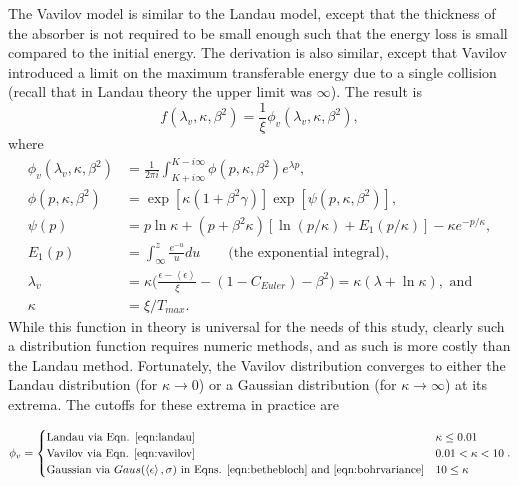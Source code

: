 \label{sec:ICOOLVavilov}\par
The Vavilov model \cite{vavilov} is similar to the Landau model, except that the thickness of the absorber is not required to be small enough such that the energy loss is small compared to the initial energy. The derivation is also similar, except that Vavilov introduced a limit on the maximum transferable energy due to a single collision (recall that in Landau theory the upper limit was $\infty$). The result is
\begin{equation}\label{eqn:vavilov}
f(\lambda_v, \kappa, \beta^2)=\frac{1}{\xi}\phi_v (\lambda_v , \kappa, \beta^2),
\end{equation}
where
\begin{align*}
\phi_v (\lambda_v,\kappa,\beta^2)&=\frac{1}{2\pi i}\int_{K+i\infty} ^{K-i\infty} \phi(p,\kappa,\beta^2) e^{\lambda p},\\
\phi(p,\kappa,\beta^2)&=\exp[\kappa(1+\beta^2 \gamma)]\exp[\psi(p,\kappa,\beta^2)],\\
\psi(p)&=p\ln \kappa + (p+\beta^2\kappa)[\ln(p/\kappa)+E_1 (p/\kappa)]-\kappa e^{-p/\kappa},\\
E_1 (p)&= \int_\infty ^z \frac{e^{-u}}{u} du \qquad \text{(the exponential integral)},\\
\lambda_v &= \kappa\Big(\frac{\epsilon-\left<\epsilon\right>}{\xi}-(1-C_{Euler})-\beta^2\Big)= \kappa(\lambda+\ln\kappa),\text{ and}\\
\kappa&=\xi/T_{max}.
\end{align*}
While this function in theory is universal for the needs of this study, clearly such a distribution function requires numeric methods, and as such is more costly than the Landau method. Fortunately, the Vavilov distribution converges to either the Landau distribution (for $\kappa\rightarrow 0$) or a Gaussian distribution (for $\kappa\rightarrow\infty$) at its extrema. The cutoffs for these extrema in practice are

\begin{align*}
\phi_v=
	\begin{cases}
	\text{Landau via Eqn. \ref{eqn:landau}} & \kappa\leq 0.01\\
	\text{Vavilov via Eqn. \ref{eqn:vavilov}} & 0.01 < \kappa < 10\\
	\text{Gaussian via }Gaus(\left<\epsilon\right>,\sigma)\text{ in Eqns. \ref{eqn:bethebloch} and \ref{eqn:bohrvariance}} & 10\leq\kappa
	\end{cases}.
\end{align*}

